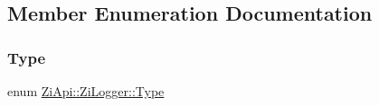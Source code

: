 \subsection{Member Enumeration Documentation}
\mbox{\label{classZiApi_1_1ZiLogger_a2344ef7fcc5f37cac04a3efc8f993424}} 
\subsubsection{\texorpdfstring{Type}{Type}}
{\footnotesize\ttfamily enum \mbox{\hyperlink{classZiApi_1_1ZiLogger_a2344ef7fcc5f37cac04a3efc8f993424}{Zi\+Api\+::\+Zi\+Logger\+::\+Type}}\hspace{0.3cm}{\ttfamily [strong]}}

